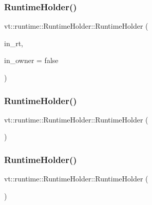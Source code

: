 \subsubsection{\texorpdfstring{Runtime\+Holder()}{RuntimeHolder()}\hspace{0.1cm}{\footnotesize\ttfamily [1/4]}}
{\footnotesize\ttfamily vt\+::runtime\+::\+Runtime\+Holder\+::\+Runtime\+Holder (\begin{DoxyParamCaption}\item[{\hyperlink{structvt_1_1runtime_1_1_runtime_holder_a9740e8aa7487fcf38b67a7e160d7b046}{Pointer\+Type}}]{in\+\_\+rt,  }\item[{bool}]{in\+\_\+owner = {\ttfamily false} }\end{DoxyParamCaption})\hspace{0.3cm}{\ttfamily [inline]}}

\mbox{\label{structvt_1_1runtime_1_1_runtime_holder_aedf8343af437d6a295b40edaa61f1c84}} 
\subsubsection{\texorpdfstring{Runtime\+Holder()}{RuntimeHolder()}\hspace{0.1cm}{\footnotesize\ttfamily [2/4]}}
{\footnotesize\ttfamily vt\+::runtime\+::\+Runtime\+Holder\+::\+Runtime\+Holder (\begin{DoxyParamCaption}\item[{std\+::nullptr\+\_\+t}]{ }\end{DoxyParamCaption})\hspace{0.3cm}{\ttfamily [inline]}}

\mbox{\label{structvt_1_1runtime_1_1_runtime_holder_a593b417829e31b5d2698d30b6aed232f}} 
\subsubsection{\texorpdfstring{Runtime\+Holder()}{RuntimeHolder()}\hspace{0.1cm}{\footnotesize\ttfamily [3/4]}}
{\footnotesize\ttfamily vt\+::runtime\+::\+Runtime\+Holder\+::\+Runtime\+Holder (\begin{DoxyParamCaption}\item[{\hyperlink{structvt_1_1runtime_1_1_runtime_holder}{Runtime\+Holder} \&\&}]{ }\end{DoxyParamCaption})\hspace{0.3cm}{\ttfamily [default]}}

